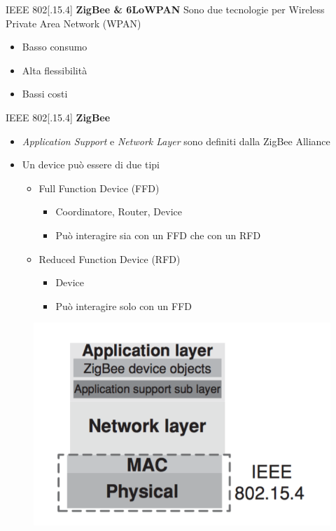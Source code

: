 \begin{frame}{IEEE 802[.15.4]}
\textbf{ZigBee \& 6LoWPAN}
	\newline
	Sono due tecnologie per Wireless Private Area Network (WPAN)
	\begin{itemize}[<+- | alert@+>]
		\item Basso consumo
		\item Alta flessibilità
		\item Bassi costi
	\end{itemize}
\end{frame}

\begin{frame}{IEEE 802[.15.4]}
\textbf{ZigBee}
\begin{itemize}
	\item \textit{Application Support} e \textit{Network Layer} sono definiti dalla ZigBee Alliance
	\item Un device può essere di due tipi
	\begin{itemize}
		\item Full Function Device (FFD)
			\begin{itemize}
				\item Coordinatore, Router, Device
				\item Può interagire sia con un FFD che con un RFD
			\end{itemize}
		\item Reduced Function Device (RFD)
			\begin{itemize}
				\item Device
				\item Può interagire solo con un FFD
			\end{itemize}
	\end{itemize}
\end{itemize}
	\begin{figure}[h] 
		\includegraphics[scale=0.3,cfbox=blue_slides 1pt 0pt]{imgs/zbprot.png}
	\end{figure}
\end{frame}


